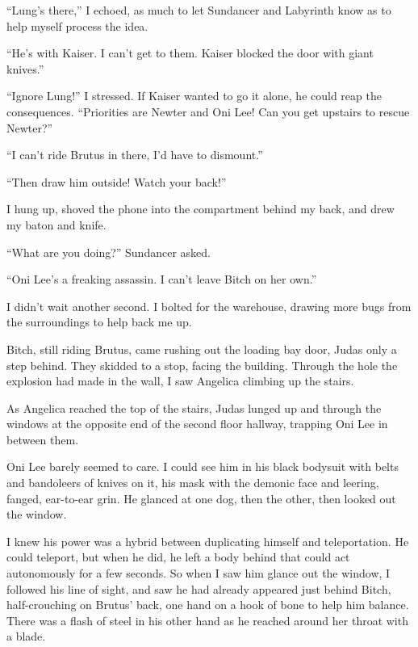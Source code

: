 





``Lung's there,'' I echoed, as much to let Sundancer and Labyrinth know as to help myself process the idea.



``He's with Kaiser.  I can't get to them.  Kaiser blocked the door with giant knives.''



``Ignore Lung!'' I stressed.  If Kaiser wanted to go it alone, he could reap the consequences.  ``Priorities are Newter and Oni Lee!  Can you get upstairs to rescue Newter?''



``I can't ride Brutus in there, I'd have to dismount.''



``Then draw him outside!  Watch your back!''



I hung up, shoved the phone into the compartment behind my back, and drew my baton and knife.



``What are you doing?'' Sundancer asked.



``Oni Lee's a freaking assassin.  I can't leave Bitch on her own.''



I didn't wait another second.  I bolted for the warehouse, drawing more bugs from the surroundings to help back me up.



Bitch, still riding Brutus, came rushing out the loading bay door, Judas only a step behind.  They skidded to a stop, facing the building.  Through the hole the explosion had made in the wall, I saw Angelica climbing up the stairs.



As Angelica reached the top of the stairs, Judas lunged up and through the windows at the opposite end of the second floor hallway, trapping Oni Lee in between them.



Oni Lee barely seemed to care.  I could see him in his black bodysuit with belts and bandoleers of knives on it, his mask with the demonic face and leering, fanged, ear-to-ear grin.  He glanced at one dog, then the other, then looked out the window.



I knew his power was a hybrid between duplicating himself and teleportation.  He could teleport, but when he did, he left a body behind that could act autonomously for a few seconds.  So when I saw him glance out the window, I followed his line of sight, and saw he had already appeared just behind Bitch, half-crouching on Brutus' back, one hand on a hook of bone to help him balance.  There was a flash of steel in his other hand as he reached around her throat with a blade.



